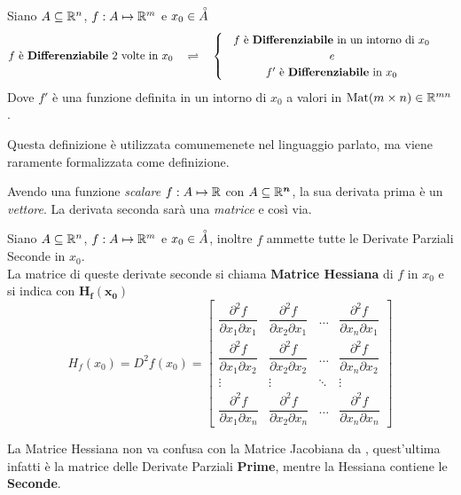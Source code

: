 \begin{definition}
	Siano $A \subseteq \mathbb{R}^n$, $f:A \mapsto \mathbb{R}^m$ e $x_0 \in \accentset{\circ}{A}$
	\[
		f \text{ è \textbf{Differenziabile} } 2 \text{ volte in } x_0
		\quad \bydef \quad
		\begin{cases}
			\text{
				\begin{tabular}{c}
					$f$ è \textbf{Differenziabile} in un intorno di $x_0$\\
					\textit{e}\\
					$f'$ è \textbf{Differenziabile} in $x_0$
				\end{tabular}
			}
		\end{cases}
	\]
	Dove $f'$ è una funzione definita in un intorno di $x_0$ a valori in $\operatorname{Mat}(m \times n) \in \mathbb{R}^{mn}$.
	\begin{note}
		Questa definizione è utilizzata comunemenete nel linguaggio parlato, ma viene raramente formalizzata come definizione.
	\end{note}
	\begin{note}
		Avendo una funzione	\textit{scalare} $f: A \mapsto \mathbb{R}$ con $A \subseteq \boldsymbol{\mathbb{R}^n}$, la sua derivata prima è un \textit{vettore}. La derivata seconda sarà una \textit{matrice} e così via.
	\end{note}
\end{definition}

\begin{definition}
	\label{def:hessiana}
	Siano $A \subseteq \mathbb{R}^n$, $f:A \mapsto \mathbb{R}^m$ e $x_0 \in \accentset{\circ}{A}$, inoltre $f$ ammette tutte le Derivate Parziali Seconde in $x_0$.\\
	La matrice di queste derivate seconde si chiama \textbf{Matrice Hessiana} di $f$ in $x_0$ e si indica con $\boldsymbol{H_f(x_0)}$
	\[
		H_f(x_0) = D^2f(x_0) =
		\begin{bmatrix}
			\dfrac{\partial^2 f}{\partial x_1 \partial x_1} & \dfrac{\partial^2 f}{\partial x_2 \partial x_1} & \dots & \dfrac{\partial^2 f}{\partial x_n \partial x_1}\\[3ex]
			\dfrac{\partial^2 f}{\partial x_1 \partial x_2} & \dfrac{\partial^2 f}{\partial x_2 \partial x_2} & \dots & \dfrac{\partial^2 f}{\partial x_n \partial x_2}\\[3ex]
			\vdots & \vdots & \ddots & \vdots\\[3ex]
			\dfrac{\partial^2 f}{\partial x_1 \partial x_n} & \dfrac{\partial^2 f}{\partial x_2 \partial x_n} & \dots & \dfrac{\partial^2 f}{\partial x_n \partial x_n}
		\end{bmatrix}
	\]
	\begin{note}
		La Matrice Hessiana non va confusa con la Matrice Jacobiana da , quest'ultima infatti è la matrice delle Derivate Parziali \textbf{Prime}, mentre la Hessiana contiene le \textbf{Seconde}.
	\end{note}
\end{definition}


